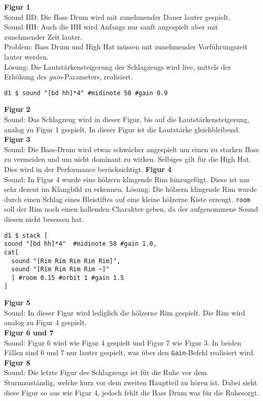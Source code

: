 \documentclass[
10pt, %
a4paper, %
oneside, %
headinclude,footinclude, %
BCOR5mm, %
]{scrartcl}
\begin{document}
\noindent \textbf{Figur 1}\\
Sound BD: Die Bass Drum wird mit zunehmender Dauer lauter gespielt.\\
Sound HH: Auch die HH wird Anfangs nur sanft angespielt aber mit zunehmender Zeit lauter.\\
Problem: Bass Drum und High Hat müssen mit zunehmender Vorführungszeit lauter werden.\\ 
Lösung: Die Lautstärkensteigerung der Schlagzeugs wird live, mittels der Erhöhung des \textit{gain}-Parameters, realisiert.
\begin{lstlisting}
d1 $ sound "[bd hh]*4" #midinote 58 #gain 0.9
\end{lstlisting}
\noindent \textbf{Figur 2}\\
Sound: Das Schlagzeug wird in dieser Figur, bis auf die Lautstärkensteigerung, analog zu Figur 1 gespielt. In dieser Figur ist die Lautstärke gleichbleibend.\\
\noindent \textbf{Figur 3}\\
Sound: Die Bass-Drum wird etwas schwächer angespielt um einen zu starken Bass zu vermeiden und um nicht dominant zu wirken. Selbiges gilt für die High Hat. Dies wird in der Performance berücksichtigt.
\noindent \textbf{Figur 4}\\
Sound: In Figur 4 wurde eine hölzern klingende Rim hinzugefügt. Diese ist nur sehr dezent im Klangbild zu erkennen.
Lösung: Die hölzern klingende Rim wurde durch einen Schlag eines Bleistiftes auf eine kleine hölzerne Kiste erzeugt. \verb|room| soll der Rim noch einen hallenden Charakter geben, da der aufgenommene Sound diesen nicht besessen hat.
 \begin{lstlisting}
d1 $ stack [
sound "[bd hh]*4"  #midinote 58 #gain 1.0,
cat[
  sound "[Rim Rim Rim Rim Rim]",
  sound "[Rim Rim Rim Rim ~]"
  ] #room 0.15 #orbit 1 #gain 1.5
]
\end{lstlisting}
\noindent \textbf{Figur 5}\\
Sound: In dieser Figur wird lediglich die hölzerne Rim gespielt. Die Rim wird analog zu Figur 4 gespielt.\\
\noindent \textbf{Figur 6 und 7}\\
Sound: Figur 6 wird wie Figur 4 gespielt und Figur 7 wie Figur 3. In beiden Fällen sind 6 und 7 nur lauter gespielt, was über den \verb|Gain|-Befehl realisiert wird.\\
\noindent \textbf{Figur 8}\\
Sound: Die letzte Figur des Schlagzeugs ist für \glqq die Ruhe vor dem Sturm\grqq zuständig, welche kurz vor dem zweiten Hauptteil zu hören ist. Dabei sieht diese Figur so aus
wie Figur 4, jedoch fehlt die Bass Drum was für die \glqq Ruhe\grqq sorgt.\\
\end{document}
